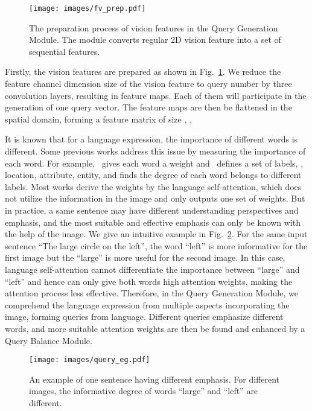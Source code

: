 \documentclass[10pt,twocolumn,letterpaper]{article}
\begin{document}
\begin{figure}[t]
   \begin{center}
      \texttt{[image: images/fv\_prep.pdf]}
   \end{center}
   \vspace{-0.1in}
   \caption{The preparation process of vision features in the Query Generation Module. The module converts regular 2D vision feature into a set of sequential features.}
   \vspace{-0.1in}
   \label{fig:fv_prep}
\end{figure}

Firstly, the vision features are prepared as shown in Fig.~\ref{fig:fv_prep}. We reduce the feature channel dimension size of the vision feature  to query number  by three convolution layers, resulting in  feature maps. Each of them will participate in the generation of one query vector. The feature maps are then be flattened in the spatial domain, forming a feature matrix  of size , \ie,


It is known that for a language expression, the importance of different words is different. Some previous works address this issue by measuring the importance of each word. For example,~\cite{luo2020multi} gives each word a weight and~\cite{yu2018mattnet,huang2020referring} defines a set of labels, \eg, location, attribute, entity, and finds the degree of each word belongs to different labels. Most works derive the weights by the language self-attention, which does not utilize the information in the image and only outputs one set of weights. But in practice, a same sentence may have different understanding perspectives and emphasis, and the most suitable and effective emphasis can only be known with the help of the image. We give an intuitive example in Fig.~\ref{fig:q_eg}. For the same input sentence ``The large circle on the left'', the word ``left'' is more informative for the first image but the ``large'' is more useful for the second image. In this case, language self-attention cannot differentiate the importance between ``large'' and ``left'' and hence can only give both words high attention weights, making the attention process less effective. Therefore, in the Query Generation Module, we comprehend the language expression from multiple aspects incorporating the image, forming  queries from language. Different queries emphasize different words, and more suitable attention weights are then be found and enhanced by a Query Balance Module.

\begin{figure}[t]
   \begin{center}
      \texttt{[image: images/query\_eg.pdf]}
   \end{center}
   \vspace{-0.1in}
   \caption{An example of one sentence having different emphasis. For different images, the informative degree of words ``large'' and ``left'' are different.}
   \vspace{-0.1in}
   \label{fig:q_eg}
\end{figure}
\end{document}
